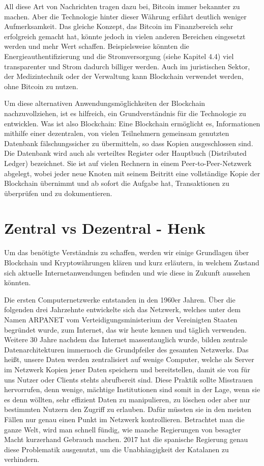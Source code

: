 All diese Art von Nachrichten tragen dazu bei, Bitcoin immer bekannter zu machen. Aber die Technologie hinter dieser Währung erfährt deutlich weniger Aufmerksamkeit. Das gleiche Konzept, das Bitcoin im Finanzbereich sehr erfolgreich gemacht hat, könnte jedoch in vielen anderen Bereichen eingesetzt werden und mehr Wert schaffen. Beispielsweise könnten die Energieauthentifizierung und die Stromversorgung (siehe Kapitel 4.4) viel transparenter und Strom dadurch billiger werden.  Auch im juristischen Sektor, der Medizintechnik oder der Verwaltung kann Blockchain verwendet werden, ohne Bitcoin zu nutzen. 

Um diese alternativen Anwendungsmöglichkeiten der Blockchain nachzuvollziehen, ist es hilfreich, ein Grundverständnis für die Technologie zu entwicklen. Was ist also Blockchain: Eine Blockchain \cite{CW21} ermöglicht es, Informationen mithilfe einer dezentralen, von vielen Teilnehmern gemeinsam genutzten Datenbank fälschungssicher zu übermitteln, so dass Kopien ausgeschlossen sind. Die Datenbank wird auch als verteiltes Register oder Hauptbuch (Distributed Ledger) bezeichnet. Sie ist auf vielen Rechnern in einem Peer-to-Peer-Netzwerk abgelegt, wobei jeder neue Knoten mit seinem Beitritt eine vollständige Kopie der Blockchain übernimmt und ab sofort die Aufgabe hat, Transaktionen zu überprüfen und zu dokumentieren.
\section{Zentral vs Dezentral - Henk}
Um das benötigte Verständnis zu schaffen, werden wir einige Grundlagen über Blockchain und Kryptowährungen klären und kurz erläutern, in welchem Zustand sich aktuelle Internetanwendungen befinden und wie diese in Zukunft aussehen könnten.

Die ersten Computernetzwerke entstanden in den 1960er Jahren. Über die folgenden drei Jahrzehnte entwickelte sich das Netzwerk, welches unter dem Namen ARPANET vom Verteidigungsministerium der Vereinigten Staaten begründet wurde, zum Internet, das wir heute kennen und täglich verwenden\cite{arpanet}. Weitere 30 Jahre nachdem das Internet massentauglich wurde, bilden zentrale Datenarchitekturen immernoch die Grundpfeiler des gesamten Netzwerks. Das heißt, unsere Daten werden zentralisiert auf wenige Computer, welche als Server im Netzwerk Kopien jener Daten speichern und bereitstellen, damit sie von für uns Nutzer oder Clients stehts abrufbereit sind. Diese Praktik sollte Misstrauen hervorrufen, denn wenige, mächtige Institutionen sind somit in der Lage, wenn sie es denn wöllten, sehr effizient Daten zu manipulieren, zu löschen oder aber nur bestimmten Nutzern den Zugriff zu erlauben. Dafür müssten sie in den meisten Fällen nur genau einen Punkt im Netzwerk kontrollieren.\cite{censorship} Betrachtet man die ganze Welt, wird man schnell fündig, wie manche Regierungen von besagter Macht kurzerhand Gebrauch machen. 2017 hat die spanische Regierung genau diese Problematik ausgenutzt, um die Unabhängigkeit der Katalanen zu verhindern\cite{catalonia}.
\clearpage

